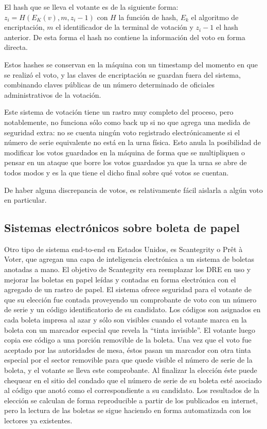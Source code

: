 El hash que se lleva el votante es de la siguiente forma: $z_i = H(E_K(v),m,z_i-1)$ con $H$ la función de hash, $E_k$ el algoritmo de encriptación, $m$ el identificador de la terminal de votación y $z_i - 1$ el hash anterior. De esta forma el hash no contiene la información del voto en forma directa.

Estos hashes se conservan en la máquina con un timestamp del momento en que se realizó el voto, y las claves de encriptación se guardan fuera del sistema, combinando claves públicas de un número determinado de oficiales administrativos de la votación.

Este sistema de votación tiene un rastro muy completo del proceso, pero notablemente, no funciona sólo como back up si no que agrega una medida de seguridad extra: no se cuenta ningún voto registrado electrónicamente si el número de serie equivalente no está en la urna física. Esto anula la posibilidad de modificar los votos guardados en la máquina de forma que se multipliquen o pensar en un ataque que borre los votos guardados ya que la urna se abre de todos modos y es la que tiene el dicho final sobre qué votos se cuentan.

De haber alguna discrepancia de votos, es relativamente fácil aislarla a algún voto en particular.

\subsection{Sistemas electrónicos sobre boleta de papel}
Otro tipo de sistema end-to-end en Estados Unidos, es Scantegrity\cite{scantegrity} o Prêt à Voter, que agregan una capa de inteligencia electrónica a un sistema de boletas anotadas a mano.
El objetivo de Scantegrity era reemplazar los DRE en uso y mejorar las boletas en papel leídas y contadas en forma electrónica con el agregado de un rastro de papel.
El sistema ofrece seguridad para el votante de que su elección fue contada proveyendo un comprobante de voto con un número de serie y un código identificatorio de su candidato. Los códigos son asignados en cada boleta impresa al azar y sólo son visibles cuando el votante marca en la boleta con un marcador especial que revela la “tinta invisible”. El votante luego copia ese código a una porción removible de la boleta. Una vez que el voto fue aceptado por las autoridades de mesa, éstos pasan un marcador con otra tinta especial por el sector removible para que quede visible el número de serie de la boleta, y el votante se lleva este comprobante. Al finalizar la elección éste puede chequear en el sitio del condado que el número de serie de su boleta esté asociado al código que anotó como el correspondiente a su candidato. Los resultados de la elección se calculan de forma reproducible a partir de los publicados en internet, pero la lectura de las boletas se sigue haciendo en forma automatizada con los lectores ya existentes.

